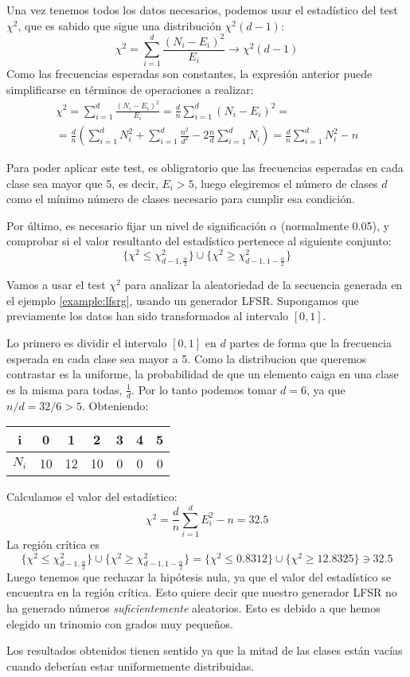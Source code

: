 Una vez tenemos todos los datos necesarios, podemos usar el estadístico del test $\chi^2$, que es sabido que sigue una distribución $\chi^2(d-1)$:
\[
\chi^2=\sum_{i=1}^d\frac{(N_i-E_i)^2}{E_i} \longrightarrow \chi^2(d-1)
\]
Como las frecuencias esperadas son constantes, la expresión anterior puede simplificarse en términos de operaciones a realizar:
\begin{multline}
\chi^2=\sum_{i=1}^d\frac{(N_i-E_i)^2}{E_i}=\frac{d}{n}\sum_{i=1}^d(N_i-E_i)^2= \\
=\frac{d}{n}\left(\sum_{i=1}^dN_i^2+\sum_{i=1}^d\frac{n^2}{d^2}-2\frac{n}{d}\sum_{i=1}^dN_i\right)=\frac{d}{n}\sum_{i=1}^dN_i^2-n
\end{multline}

Para poder aplicar este test, es obligratorio que las frecuencias esperadas en cada clase sea mayor que 5, es decir, $E_i>5$, luego elegiremos el número de clases $d$ como el mínimo número de clases necesario para cumplir esa condición.

Por último, es necesario fijar un nivel de significación $\alpha$ (normalmente  0.05), y comprobar si el valor resultanto del estadístico pertenece al siguiente conjunto:
\[
\{\chi^2\leq \chi^2_{d-1,\frac{\alpha}{2}}\}\cup\{\chi^2\geq \chi^2_{d-1,1-\frac{\alpha}{2}}\}
\]

\begin{example}
Vamos a usar el test $\chi^2$ para analizar la aleatoriedad de la secuencia generada en el ejemplo \ref{example:lfsrg}, usando un generador LFSR. Supongamos que previamente los datos han sido transformados al intervalo $[0,1]$.

Lo primero es dividir el intervalo $[0,1]$ en $d$ partes de forma que la frecuencia esperada en cada clase sea mayor a 5. Como la distribucion que queremos contrastar es la uniforme, la probabilidad de que un elemento caiga en una clase es la misma para todas, $\frac{1}{d}$. Por lo tanto podemos tomar $d=6$, ya que $n/d=32/6>5$. Obteniendo:

\begin{center}
\begin{tabular}{c|cccccc}
i & 0 & 1 & 2 & 3 & 4 & 5 \\ 
\hline 
$N_i$ & 10 & 12 & 10 & 0 & 0 & 0 \\ 
\end{tabular} 
\end{center}
Calculamos el valor del estadístico:
\[
\chi^2=\frac{d}{n}\sum_{i=1}^dE_i^2-n=32.5
\]
La región crítica es 
\[
\{\chi^2\leq \chi^2_{d-1,\frac{\alpha}{2}}\}\cup\{\chi^2\geq \chi^2_{d-1,1-\frac{\alpha}{2}}\}=
\{\chi^2\leq 0.8312 \}\cup\{\chi^2\geq 12.8325 \}\ni 32.5
\]
Luego tenemos que rechazar la hipótesis nula, ya que el valor del estadístico se encuentra en la región crítica. Esto quiere decir que nuestro generador LFSR no ha generado números \textit{suficientemente} aleatorios. Esto es debido a que hemos elegido un trinomio con grados muy pequeños.

Los resultados obtenidos tienen sentido ya que la mitad de las clases están vacías cuando deberían estar uniformemente distribuidas.

\end{example}

